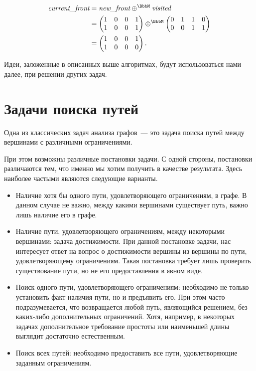 \begin{example}
    \begin{align*}
        \emph{current\_front} & = \emph{new\_front} \oplus^\BbbM \emph{visited} \\
                              &=
        \begin{pmatrix}
            1 & 0 & 0 & 1 \\
            1 & 0 & 0 & 1
        \end{pmatrix} \oplus^\BbbM
        \begin{pmatrix}
            0 & 1 & 1 & 0 \\
            0 & 0 & 1 & 1
        \end{pmatrix}        \\ &=
        \begin{pmatrix}
            1 & 0 & 0 & 1 \\
            1 & 0 & 0 & 0
        \end{pmatrix}.
    \end{align*}

\end{example}

Идеи, заложенные в описанных выше алгоритмах, будут использоваться нами далее, при решении других задач.

\section{Задачи поиска путей}

Одна из классических задач анализа графов~--- это задача поиска путей между вершинами с различными ограничениями.

При этом возможны различные постановки задачи.
С одной стороны, постановки различаются тем, что именно мы хотим получить в качестве результата.
Здесь наиболее частыми являются следующие варианты.

\begin{itemize}
    \item Наличие хотя бы одного пути, удовлетворяющего ограничениям, в графе.
          В данном случае не важно, между какими вершинами существует путь, важно лишь наличие его в графе.
    \item Наличие пути, удовлетворяющего ограничениям, между некоторыми вершинами: задача достижимости.
          При данной постановке задачи, нас интересует ответ на вопрос о достижимости вершины  из вершины  по пути, удовлетворяющему ограничениям.
          Такая постановка требует лишь проверить существование пути, но не его предоставления в явном виде.
    \item Поиск одного пути, удовлетворяющего ограничениям: необходимо не только установить факт наличия пути, но и  предъявить его.
          При этом часто подразумевается, что возвращается любой путь, являющийся решением, без каких-либо дополнительных ограничений.
          Хотя, например, в некоторых задачах дополнительное требование простоты или наименьшей длины выглядит достаточно естественным.
    \item Поиск всех путей: необходимо предоставить все пути, удовлетворяющие заданным ограничениям.
\end{itemize}

